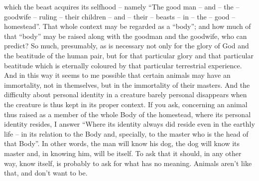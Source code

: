 \begin{footnotesize}
\begin{sffamily}
which the beast acquires its selfhood – namely “The good man – and – the – goodwife – ruling – their children – and – their – beasts – in – the – good – homestead”. That whole context may be regarded as a “body”; and how much of that “body” may be raised along with the goodman and the goodwife, who can predict? So much, presumably, as is necessary not only for the glory of God and the beatitude of the human pair, but for that particular glory and that particular beatitude which is eternally coloured by that particular terrestrial experience. And in this way it seems to me possible that certain animals may have an immortality, not in themselves, but in the immortality of their masters. And the difficulty about personal identity in a creature barely personal disappears when the creature is thus kept in its proper context. If you ask, concerning an animal thus raised as a member of the whole Body of the homestead, where its personal identity resides, I answer “Where its identity always did reside even in the earthly life – in its relation to the Body and, specially, to the master who is the head of that Body”. In other words, the man will know his dog, the dog will know its master and, in knowing him, will be itself. To ask that it should, in any other way, know itself, is probably to ask for what has no meaning. Animals aren't like that, and don't want to be. 


\end{sffamily}
\end{footnotesize}
